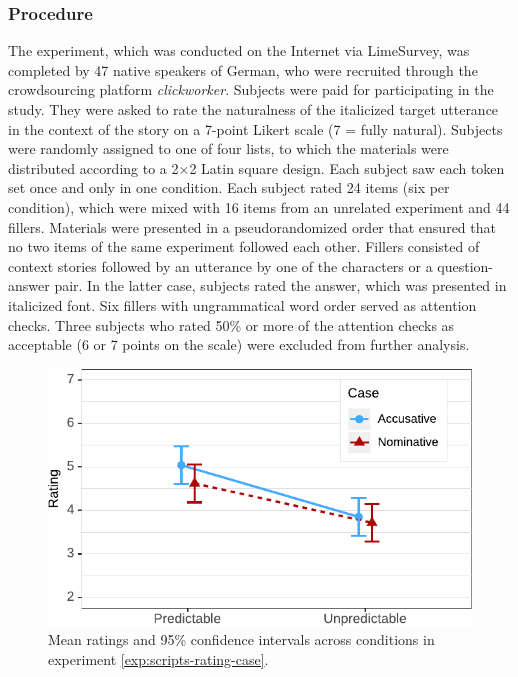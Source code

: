 \subsubsection{Procedure}
The experiment, which was conducted on the Internet via LimeSurvey, was completed by 47 native speakers of German, who were recruited through the crowdsourcing platform \textit{clickworker}. Subjects were paid  for participating in the study. They were asked to rate the naturalness of the italicized target utterance in the context of the story on a 7-point Likert scale (7 = fully natural). Subjects were randomly assigned to one of four lists, to which the materials were distributed according to a 2$\times$2 Latin square design. Each subject saw each token set once and only in one condition. Each subject rated 24 items (six per condition), which were mixed with 16 items from an unrelated experiment and 44 fillers. Materials were presented in a pseudorandomized order that ensured that no two items of the same experiment followed each other. Fillers consisted of context stories followed by an utterance by one of the characters or a question-answer pair. In the latter case, subjects rated the answer, which was presented in italicized font. Six fillers with ungrammatical word order served as attention checks. Three subjects who rated 50\% or more of the attention checks as acceptable (6 or 7 points on the scale) were excluded from further analysis.

\begin{figure}
\includegraphics[scale=1]{figures/scripts_case_estimates}
\caption{Mean ratings and 95\% confidence intervals across conditions in experiment \ref{exp:scripts-rating-case}. \label{fig:scr-case-estimates}}
\end{figure}

